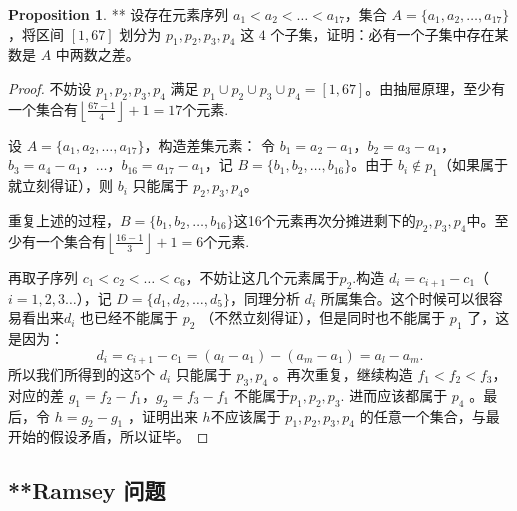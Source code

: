 \documentclass[oneside]{book}
\theoremstyle{definition}
\newtheorem{proposition}{Proposition}[section]
\begin{document}
	\begin{proposition}**
		设存在元素序列 \( a_1 < a_2 < \dots < a_{17} \)，集合 \( A = \{a_1, a_2, \dots, a_{17}\} \)，将区间 \([1, 67]\) 划分为 \( p_1, p_2, p_3, p_4 \) 这 \( 4 \) 个子集，证明：必有一个子集中存在某数是 \( A \) 中两数之差。 
	\end{proposition}
	
	\begin{proof}
		不妨设 \( p_1, p_2, p_3, p_4 \) 满足 \( p_1 \cup p_2 \cup p_3 \cup p_4 = [1, 67] \)。由抽屉原理，至少有一个集合有\( \left\lfloor \frac{67 - 1}{4} \right\rfloor + 1 =17\)个元素.
		
		设 \( A = \{a_1, a_2, \dots, a_{17}\} \)，构造差集元素：  
		令 \( b_1 = a_2 - a_1 \)，\( b_2 = a_3 - a_1 \)，\( b_3 = a_4 - a_1 \)，\(\dots\)，\( b_{16} = a_{17} - a_1 \)，记 \( B = \{b_1, b_2, \dots, b_{16}\} \)。由于 \( b_i \notin p_1 \)（如果属于就立刻得证），则 \( b_i \) 只能属于 \( p_2, p_3, p_4 \)。  
		
		重复上述的过程，\( B = \{b_1, b_2, \dots, b_{16}\} \)这16个元素再次分摊进剩下的\( p_2, p_3, p_4 \)中。至少有一个集合有\( \left\lfloor \frac{16 - 1}{3} \right\rfloor + 1 =6\)个元素.
		
		再取子序列 \( c_1 < c_2 < \dots < c_6 \)，不妨让这几个元素属于\(p_2\).构造 \( d_i = c_{i + 1} - c_1 \)（\( i = 1,2,3 \dots \)），记 \( D = \{d_1, d_2, \dots, d_5\} \)，同理分析 \( d_i \) 所属集合。这个时候可以很容易看出来\( d_i\) 也已经不能属于 \( p_2 \) （不然立刻得证），但是同时也不能属于  \( p_1 \) 了，这是因为：
		$$d_i=c_{i+1}-c_1=(a_l-a_1)-(a_m-a_1)=a_l-a_m.$$
		所以我们所得到的这5个 \( d_i \) 只能属于 \( p_3,p_4\) 。再次重复，继续构造 \( f_1 < f_2 < f_3 \)，对应的差 \( g_1 = f_2 - f_1 \)，\( g_2 = f_3 - f_1 \) 不能属于\( p_1,p_2,p_3\).
		进而应该都属于 \( p_4 \) 。最后，令 \( h = g_2 - g_1 \) ，证明出来 \( h \)不应该属于 \( p_1, p_2, p_3, p_4 \) 的任意一个集合，与最开始的假设矛盾，所以证毕。
	\end{proof}
	\subsection{**Ramsey 问题}
\end{document}
